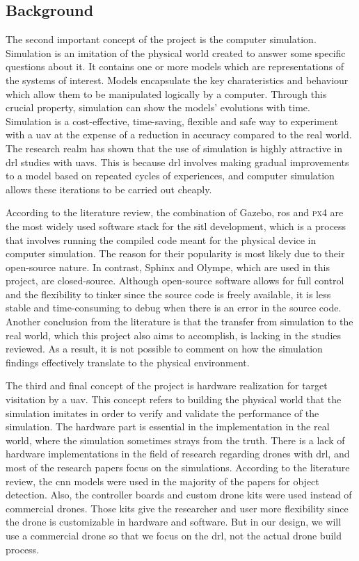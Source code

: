 \documentclass[../main.tex]{subfiles}
\begin{document}
\subsection{Background}

The second important concept of the project is the computer simulation.
Simulation is an imitation of the physical world
created to answer some specific questions about it.
It contains one or more models 
which are representations of the systems of interest.
Models encapsulate the key charateristics and behaviour 
which allow them to be manipulated logically by a computer.
Through this crucial property, simulation can show 
the models' evolutions with time.
Simulation is a cost-effective, time-saving, flexible 
and safe way to experiment with a \gls{uav}
at the expense of a reduction in accuracy compared to the real world.
The research realm has shown that the use of simulation 
is highly attractive in \gls{drl} studies with \glspl{uav}.
This is because \gls{drl} involves
making gradual improvements to a model based on 
repeated cycles of experiences, and computer simulation 
allows these iterations to be carried out cheaply.

According to the literature review, 
the combination of Gazebo, \gls{ros}
and \textsc{px4} are the most widely used software stack 
for the \gls{sitl} development,
which is a process that involves running the compiled code
meant for the physical device in computer simulation.
The reason for their popularity is most likely 
due to their open-source nature. 
In contrast, Sphinx and Olympe, which are used in this project, 
are closed-source.
Although open-source software 
allows for full control and the flexibility to tinker
since the source code is freely available,
it is less stable and time-consuming to debug
when there is an error in the source code.
Another conclusion from the literature is that 
the transfer from simulation to the real world,
which this project also aims to accomplish,
is lacking in the studies reviewed.
As a result, it is not possible to comment on 
how the simulation findings effectively translate
to the physical environment.

The third and final concept of the project 
is hardware realization for target visitation by a \gls{uav}.
This concept refers to building the physical world
that the simulation imitates in order to 
verify and validate the performance of the simulation.
The hardware part is essential in the implementation 
in the real world, where the simulation 
sometimes strays from the truth.
There is a lack of hardware implementations in 
the field of research regarding drones with \gls{drl}, 
and most of the research papers focus on the simulations.
According to the literature review, the \gls{cnn} 
models were used in the majority of the papers for object detection. 
Also, the controller boards and custom drone kits 
were used instead of commercial drones.
Those kits give the researcher and user more flexibility 
since the drone is customizable 
in hardware and software. But in our design, 
we will use a commercial drone so that we focus
on the \gls{drl}, not the actual drone build process. 
\end{document}
